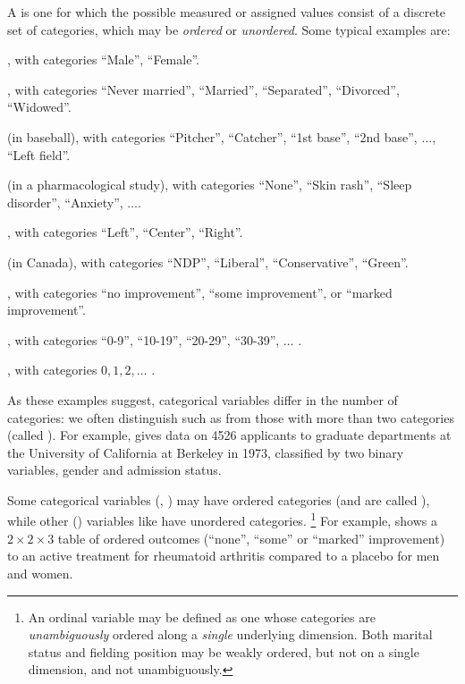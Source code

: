 \documentclass[11pt]{book}\usepackage[]{graphicx}\usepackage[]{color}
\begin{document}
A  is one for which the possible measured
or assigned values
consist of a discrete set of categories, which may be \emph{ordered} or
\emph{unordered}.
Some typical examples are:
\begin{itemize*}
\item {}, with categories ``Male'', ``Female''.
\item {}, with categories ``Never married'', ``Married'',
``Separated'', ``Divorced'', ``Widowed''.
\item {} (in baseball), with categories
``Pitcher'', ``Catcher'', ``1st base'', ``2nd base'',  $\dots$, ``Left field''.
\item {} (in a pharmacological study), with categories
``None'', ``Skin rash'', ``Sleep disorder'', ``Anxiety'', $\dots$.
\item {}, with categories ``Left'', ``Center'', ``Right''.
\item {} (in Canada), with categories ``NDP'', ``Liberal'', ``Conservative'', ``Green''.
\item {}, with categories ``no improvement'', ``some
improvement'', or ``marked improvement''.
\item {}, with categories ``0-9'', ``10-19'', ``20-29'', ``30-39'', 
$\dots$ .
\item {}, with categories $0, 1, 2, \dots$ .
\end{itemize*}

As these examples suggest, categorical variables differ in the number of
categories: we often distinguish 
 such as 
from those with more than two categories (called ).
For example,  gives data on 4526 applicants
to graduate departments at the University of California at Berkeley
in 1973, classified by two binary variables, gender and admission status.


Some categorical variables (, )
may have ordered categories (and are called ),
while other () variables like 
have unordered categories.%
\footnote{An ordinal variable may be defined as one whose categories are
\emph{unambiguously} ordered along a \emph{single} underlying dimension.
Both marital status and fielding position may be weakly ordered, but
not on a single dimension, and not unambiguously.} 
For example,  shows a $2 \times 2 \times 3$ table of 
ordered outcomes (``none'', ``some'' or ``marked'' improvement)
to an active treatment for rheumatoid
arthritis compared to a placebo for men and women.

\end{document}
